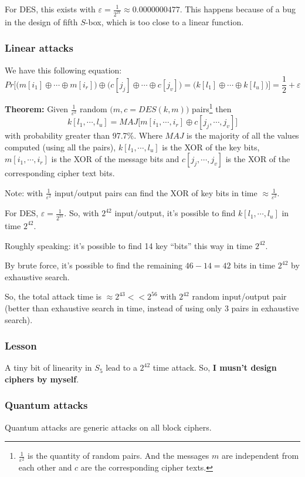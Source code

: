 \documentclass[12pt]{book}
\newcommand{\Thm}{\textbf{Theorem:} }
\begin{document}
For DES, this exists with $\varepsilon=\frac{1}{2^{21}}\approx0.0000000477$. This happens because of a bug in the design of fifth $S$-box, which is too close to a linear function.

\subsubsection{Linear attacks}
We have this following equation:
$$Pr\Big[\big(m[i_{1}]\oplus\cdots\oplus m[i_{r}]\big)\oplus\big(c[j_{j}]\oplus\cdots\oplus c[j_{v}]\big)=\big(k[l_{1}]\oplus\cdots\oplus k[l_{u}]\big)\Big]=\frac{1}{2}+\varepsilon$$

\Thm Given $\frac{1}{\varepsilon^{2}}$ random $\big(m,c=DES(k,m)\big)$ pairs\footnote{$\frac{1}{\varepsilon^{2}}$ is the quantity of random pairs. And the messages $m$ are independent from each other and $c$ are the corresponding cipher texts.} then
$$k[l_{1},\cdots,l_{u}]=MAJ\big[m[i_{1},\cdots,i_{r}]\oplus c[j_{j},\cdots,j_{v}]\big]$$with probability greater than 97.7\%. Where $MAJ$ is the majority of all the values computed (using all the pairs), $k[l_{1},\cdots,l_{u}]$ is the XOR of the key bits, $m[i_{1},\cdots,i_{r}]$ is the XOR of the message bits and $c[j_{j},\cdots,j_{v}]$ is the XOR of the corresponding cipher text bits.

Note: with $\frac{1}{\varepsilon^{2}}$ input/output pairs can find the XOR of key bits in time $\approx\frac{1}{\varepsilon^{2}}$.

For DES, $\varepsilon=\frac{1}{2^{21}}$. So, with $2^{42}$ input/output, it's possible to find $k[l_{1},\cdots,l_{u}]$ in time $2^{42}$.

Roughly speaking: it's possible to find 14 key ``bits'' this way in time $2^{42}$.

By brute force, it's possible to find the remaining $46-14=42$ bits in time $2^{42}$ by exhaustive search.

So, the total attack time is $\approx2^{43}<<2^{56}$ with $2^{42}$ random input/output pair (better than exhaustive search in time, instead of using only 3 pairs in exhaustive search).

\subsubsection{Lesson}
A tiny bit of linearity in $S_{5}$ lead to a $2^{42}$ time attack. So, \textbf{I musn't design ciphers by myself}.

\subsubsection{Quantum attacks}
Quantum attacks are generic attacks on all block ciphers.
\end{document}
